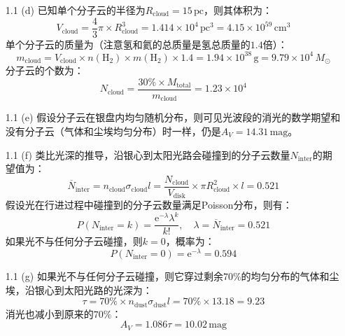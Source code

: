 \documentclass[a4paper,fontset=none]{ctexart}
\begin{document}
\begin{enumerate}
    \item[1.1 (d)]
    已知单个分子云的半径为$R_{\mathrm{cloud}} = 15\,\mathrm{pc}$，则其体积为：
    \[
        V_{\mathrm{cloud}} = \frac{4}{3}\pi \times R_{\mathrm{cloud}}^3 = 1.414 \times 10^4\,\mathrm{pc^3} = 4.15 \times 10^{59}\,\mathrm{cm^3}
    \]
    单个分子云的质量为（注意氢和氦的总质量是氢总质量的$1.4$倍）：
    \[
        m_{\mathrm{cloud}} = V_{\mathrm{cloud}} \times n(\mathrm{H_2}) \times m(\mathrm{H_2}) \times 1.4 = 1.94 \times 10^{38}\,\mathrm{g} = 9.79 \times 10^4\,M_\odot
    \]
    分子云的个数为：
    \[
        N_{\mathrm{cloud}} = \frac{30\% \times M_{\mathrm{total}}}{m_{\mathrm{cloud}}} = 1.23 \times 10^4
    \]

    \item[1.1 (e)]
    假设分子云在银盘内均匀随机分布，则可见光波段的消光的数学期望和没有分子云（气体和尘埃均匀分布）时一样，仍是$A_V = 14.31\,\mathrm{mag}$。

    \item[1.1 (f)]
    类比光深的推导，沿银心到太阳光路会碰撞到的分子云数量$N_{\mathrm{inter}}$的期望值为：
    \[
        \overline{N}_{\mathrm{inter}} = n_{\mathrm{cloud}} \sigma_{\mathrm{cloud}} l = \frac{N_{\mathrm{cloud}}}{V_{\mathrm{disk}}} \times \pi R_{\mathrm{cloud}}^2 \times l = 0.521
    \]
    假设光在行进过程中碰撞到的分子云数量满足Poisson分布，则有：
    \[
        P(N_{\mathrm{inter}} = k) = \frac{\mathrm{e}^{-\lambda} \lambda^k}{k!},\quad \lambda = \overline{N}_{\mathrm{inter}} = 0.521
    \]
    如果光不与任何分子云碰撞，则$k = 0$，概率为：
    \[
        P(N_{\mathrm{inter}} = 0) = \mathrm{e}^{-\lambda} = 0.594
    \]

    \item[1.1 (g)]
    如果光不与任何分子云碰撞，则它穿过剩余$70\%$的均匀分布的气体和尘埃，沿银心到太阳光路的光深为：
    \[
        \tau = 70\% \times n_{\mathrm{dust}}\sigma_{\mathrm{dust}} l = 70\% \times 13.18 = 9.23
    \]
    消光也减小到原来的$70\%$：
    \[
        A_V = 1.086\tau = 10.02\,\mathrm{mag}
    \]
\end{enumerate}
\end{document}
